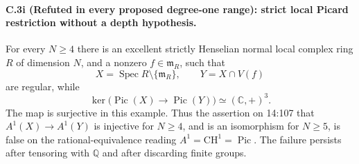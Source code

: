 \paragraph{C.3i (Refuted in every proposed degree-one range): strict local Picard restriction without a depth hypothesis.}
For every $N\ge4$ there is an excellent strictly Henselian
normal local complex ring $R$ of dimension $N$, and a
nonzero $f\in\mathfrak m_R$, such that
\[
 X=\operatorname{Spec}R\setminus\{\mathfrak m_R\},\qquad
 Y=X\cap V(f)
\]
are regular, while
\begin{equation}\label{eq:C3-picard-kernel}
 \ker\bigl(\operatorname{Pic}(X)\longrightarrow
                  \operatorname{Pic}(Y)\bigr)
             \simeq (\mathbb C,+)^3.
\end{equation}
The map is surjective in this example. Thus the assertion
on 14:107 that $A^1(X)\to A^1(Y)$ is injective for $N\ge4$,
and is an isomorphism for $N\ge5$, is false on the
rational-equivalence reading $A^1=\mathrm{CH}^1=\operatorname{Pic}$.
The failure persists after tensoring with $\mathbb Q$ and
after discarding finite groups.

